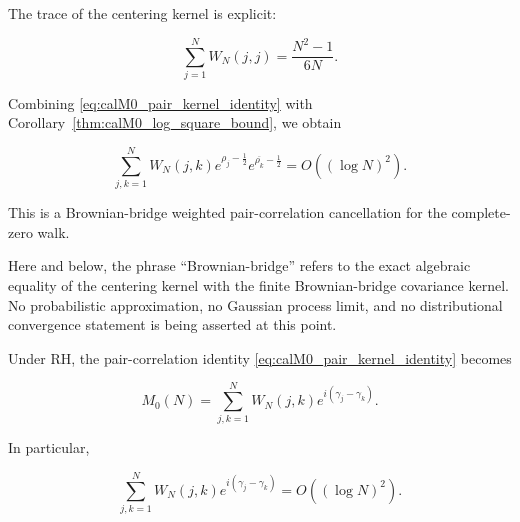 \documentclass[11pt]{amsart}
\numberwithin{equation}{section}
\theoremstyle{plain}
\theoremstyle{definition}
\theoremstyle{remark}
\begin{document}
The trace of the centering kernel is explicit:

\begin{equation}
\sum_{j=1}^{N}W_N(j,j)
=
\frac{N^2-1}{6N}.
\label{eq:WN_diagonal_trace}
\end{equation}

Combining \eqref{eq:calM0_pair_kernel_identity} with
Corollary~\ref{thm:calM0_log_square_bound}, we obtain

\begin{equation}
\sum_{j,k=1}^{N}
W_N(j,k)e^{\rho_j-\frac12}e^{\overline{\rho_k}-\frac12}
=
O\!\left((\log N)^2\right).
\label{eq:weighted_pair_correlation_bound}
\end{equation}

This is a Brownian-bridge weighted pair-correlation cancellation for the
complete-zero walk.

Here and below, the phrase ``Brownian-bridge'' refers to the exact
algebraic equality of the centering kernel with the finite
Brownian-bridge covariance kernel. No probabilistic approximation, no
Gaussian process limit, and no distributional convergence statement is
being asserted at this point.

Under RH, the pair-correlation identity
\eqref{eq:calM0_pair_kernel_identity} becomes

\begin{equation}
M_0(N)
=
\sum_{j,k=1}^{N}
W_N(j,k)e^{i(\gamma_j-\gamma_k)}.
\label{eq:M0_pair_kernel_identity_RH}
\end{equation}

In particular,

\begin{equation}
\sum_{j,k=1}^{N}
W_N(j,k)e^{i(\gamma_j-\gamma_k)}
=
O\!\left((\log N)^2\right).
\label{eq:weighted_pair_correlation_bound_RH}
\end{equation}
\end{document}
